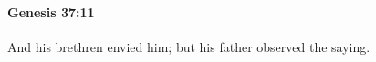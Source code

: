 
		\paragraph{Genesis 37:11} %
			\label{GENESIS-37-11}

			And his brethren envied him; but his father observed the saying.


